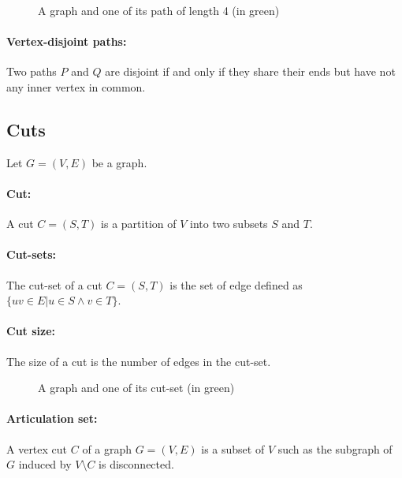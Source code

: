 \begin{figure}[!h]
  \begin{center}
    
  \end{center}
  \caption{A graph and one of its path of length 4 (in green)}
\end{figure}

\paragraph{Vertex-disjoint paths:}
Two paths $P$ and $Q$ are disjoint if and only if they share their ends but
have not any inner vertex in common.

\subsection{Cuts}
Let $G=(V,E)$ be a graph.
\paragraph{Cut:}
A cut $C=(S,T)$ is a partition of $V$ into two subsets $S$ and $T$.

\paragraph{Cut-sets:}
The cut-set of a cut $C=(S,T)$ is the set of edge defined as $\{uv \in E | u \in S \wedge v \in T\}$.

\paragraph{Cut size:}
The size of a cut is the number of edges in the cut-set.

\begin{figure}[!h]
  \begin{center}
    
  \end{center}
  \caption{A graph and one of its cut-set (in green)}
\end{figure}


\paragraph{Articulation set:}
A vertex cut $C$ of a graph $G=(V,E)$ is a subset of $V$ such as the subgraph
of $G$ induced by $V \setminus C$ is disconnected.

